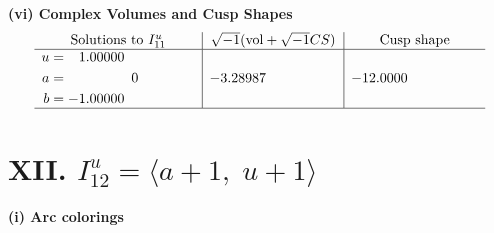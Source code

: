 \documentclass[1p]{elsarticle_modified}
\theoremstyle{definition}
\newcommand{\I}{\sqrt{-1}}
\begin{document}
\newpage\flushleft \textbf{(vi) Complex Volumes and Cusp Shapes}
$$\begin{array}{c|c|c}  
\text{Solutions to }I^u_{11}& \I (\text{vol} + \sqrt{-1}CS) & \text{Cusp shape}\\
 \hline 
\begin{aligned}
u &= \phantom{-}1.00000\phantom{ +0.000000I} \\
a &= \phantom{-0.000000 } 0 \\
b &= -1.00000\phantom{ +0.000000I}\end{aligned}
 & -3.28987\phantom{ +0.000000I} & -12.0000\phantom{ +0.000000I}\\
 \hline 
 \end{array}$$\newpage\newpage\renewcommand{\arraystretch}{1}
\centering \section*{XII. $I^u_{12}= \langle a+1,\;u+1 \rangle$}
\flushleft \textbf{(i) Arc colorings}\\
\end{document}
